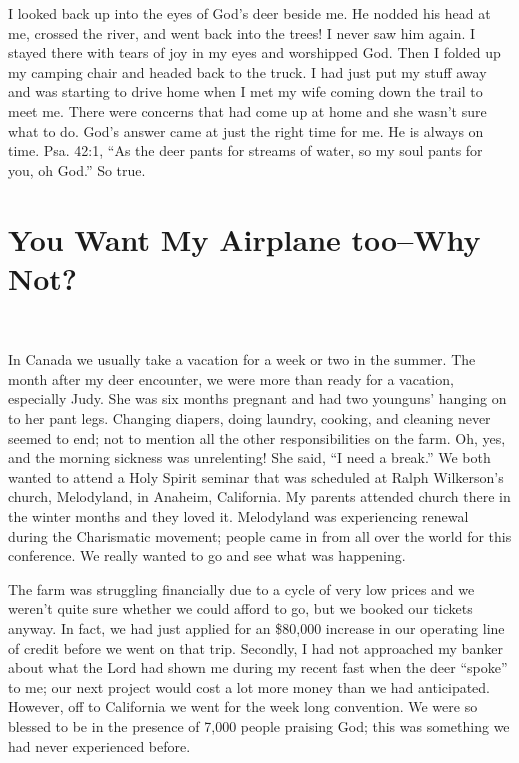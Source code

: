 \documentclass[oneside]{book}
\begin{document}
I looked back up into the eyes of God's deer beside me. He nodded his head at me, crossed the river, and went back into the trees! I never saw him again. I stayed there with tears of joy in my eyes and worshipped God. Then I folded up my camping chair and headed back to the truck. I had just put my stuff away and was starting to drive home when I met my wife coming down the trail to meet me. There were concerns that had come up at home and she wasn't sure what to do. God's answer came at just the right time for me. He is always on time. Psa. 42:1, “As the deer pants for streams of water, so my soul pants for you, oh God.” So true.


\section{You Want My Airplane too--Why Not?}
\

In Canada we usually take a  vacation for a week or two in the summer. The month after my deer encounter, we were more than ready for a vacation, especially Judy. She was six months pregnant and had two younguns' hanging on to her pant legs. Changing diapers, doing laundry, cooking, and cleaning never seemed to end; not to mention all the other responsibilities on the farm. Oh, yes, and the morning sickness was unrelenting! She said, “I need a break.” We both wanted to attend a Holy Spirit seminar that was scheduled at Ralph Wilkerson's church, Melodyland, in Anaheim, California. My parents attended church there in the winter months and they loved it. Melodyland was experiencing renewal during the Charismatic movement; people came in from all over the world for this conference. We really wanted to go and see what was happening. 

The farm was struggling financially due to a cycle of very low prices and we weren't quite sure whether we could afford to go, but we booked our tickets anyway. In fact, we had just applied for an \$80,000 increase in our operating line of credit before we went on that trip. Secondly, I had not approached my banker about what the Lord had shown me during my recent fast when the deer “spoke” to me; our next project would cost a lot more money than we had anticipated. However, off to California we went for the week long convention. We were so blessed to be in the presence of 7,000 people praising God; this was something we had never experienced before.
\end{document}

